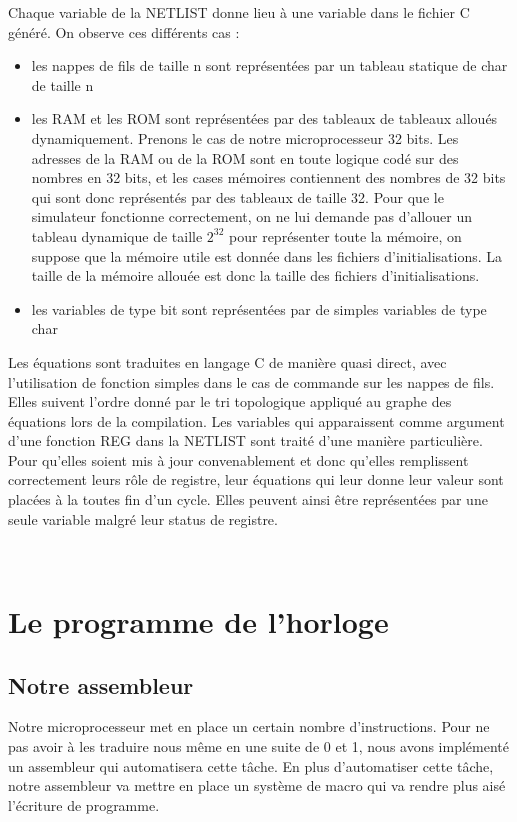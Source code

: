 \documentclass[a4paper, 12pt, twoside]{report}
\begin{document}
Chaque variable de la NETLIST donne lieu à une variable dans le fichier C généré. On 
observe ces différents cas :
\begin{itemize}
\item les nappes de fils de taille n sont représentées par un tableau statique de char de taille n
\item les RAM et les ROM sont représentées par des tableaux de tableaux alloués dynamiquement. Prenons le cas 
      de notre microprocesseur 32 bits. Les adresses de la RAM ou de la ROM sont en toute logique 
      codé sur des nombres en 32 bits, et les cases mémoires contiennent des nombres de 32 bits qui 
      sont donc représentés par des tableaux de taille 32. Pour que le simulateur fonctionne correctement, 
      on ne lui demande pas d'allouer un tableau dynamique de taille $2^{32}$ pour représenter toute la 
      mémoire, on suppose que la mémoire utile est donnée dans les fichiers d'initialisations. La taille 
      de la mémoire allouée est donc la taille des fichiers d'initialisations.
\item les variables de type bit sont représentées par de simples variables de type char\\
\end{itemize}

Les équations sont traduites en langage C de manière quasi direct, avec l'utilisation de fonction 
simples dans le cas de commande sur les nappes de fils. Elles suivent l'ordre donné par le tri 
topologique appliqué au graphe des équations lors de la compilation. Les variables qui 
apparaissent comme argument d'une fonction REG dans la NETLIST sont traité d'une manière particulière. 
Pour qu'elles soient mis à jour convenablement et donc qu'elles remplissent correctement leurs 
rôle de registre, leur équations qui leur donne leur valeur sont placées à la toutes fin d'un 
cycle. Elles peuvent ainsi être représentées par une seule variable malgré leur status de registre.

\newpage~
\newpage~

\section{Le programme de l'horloge}

\subsection{Notre assembleur}
Notre microprocesseur met en place un certain nombre d'instructions. Pour ne pas avoir 
à les traduire nous même en une suite de 0 et 1, nous avons implémenté un assembleur 
qui automatisera cette tâche. En plus d'automatiser cette tâche, notre assembleur va 
mettre en place un système de macro qui va rendre plus aisé l'écriture de programme.\\
\end{document}

